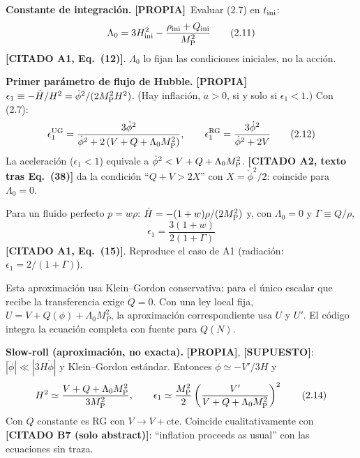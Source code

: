 \documentclass[11pt,a4paper]{article}
\newcommand{\MP}{M_{\rm P}}
\newcommand{\propia}{{\bfseries\color{TealBlue}[PROPIA]}}
\newcommand{\supuesto}{{\bfseries\color{Plum}[SUPUESTO]}}
\newcommand{\citado}[1]{{\bfseries\color{RoyalBlue}[CITADO #1]}}
\newcommand{\sub}[2]{\par\medskip\noindent{\bfseries\color{NavyBlue}#1}\quad\textbf{#2}}
\begin{document}
\sub{2.6}{Constante de integración.} \propia\ Evaluar (2.7) en $t_{\rm ini}$:
\begin{equation}
\Lambda_0=3H_{\rm ini}^2-\frac{\rho_{\rm ini}+Q_{\rm ini}}{\MP^2}\tag{2.11}
\end{equation}
\citado{A1, Eq.~(12)}. $\Lambda_0$ lo fijan las condiciones iniciales, no la acción.

\sub{2.7}{Primer parámetro de flujo de Hubble.} \propia\ $\epsilon_1\equiv-\dot H/H^2=\dot\phi^2/(2\MP^2H^2)$. (Hay inflación, $\ddot a>0$, si y solo si $\epsilon_1<1$.) Con (2.7):
\begin{equation}
\epsilon_1^{\rm UG}=\frac{3\dot\phi^2}{\dot\phi^2+2\,(V+Q+\Lambda_0\MP^2)},\qquad
\epsilon_1^{\rm RG}=\frac{3\dot\phi^2}{\dot\phi^2+2V}\tag{2.12}
\end{equation}
La aceleración ($\epsilon_1<1$) equivale a $\dot\phi^2<V+Q+\Lambda_0\MP^2$. \citado{A2, texto tras Eq.~(38)} da la condición ``$Q+V>2X$'' con $X=\dot\phi^2/2$: coincide para $\Lambda_0=0$.

Para un fluido perfecto $p=w\rho$: $\dot H=-(1+w)\rho/(2\MP^2)$ y, con $\Lambda_0=0$ y $\Gamma\equiv Q/\rho$,
\begin{equation}
\epsilon_1=\frac{3(1+w)}{2(1+\Gamma)}\tag{2.13}
\end{equation}
\citado{A1, Eq.~(15)}. Reproduce el caso de A1 (radiación: $\epsilon_1=2/(1+\Gamma)$).

Esta aproximación usa Klein--Gordon conservativa: para el único escalar que recibe la transferencia exige $\dot Q=0$. Con una ley local fija, $U=V+Q(\phi)+\Lambda_0 M_P^2$, la aproximación correspondiente usa $U$ y $U\prime$. El código integra la ecuación completa con fuente para $Q(N)$.

\sub{2.8}{Slow-roll (aproximación, no exacta).} \propia, \supuesto: $|\ddot\phi|\ll|3H\dot\phi|$ y Klein--Gordon estándar. Entonces $\dot\phi\simeq-V'/3H$ y
\begin{equation}
H^2\simeq\frac{V+Q+\Lambda_0\MP^2}{3\MP^2},\qquad
\epsilon_1\simeq\frac{\MP^2}2\left(\frac{V'}{V+Q+\Lambda_0\MP^2}\right)^2\tag{2.14}
\end{equation}
Con $Q$ constante es RG con $V\to V+\text{cte}$. Coincide cualitativamente con \citado{B7 (solo abstract)}: ``inflation proceeds as usual'' con las ecuaciones sin traza.
\end{document}
